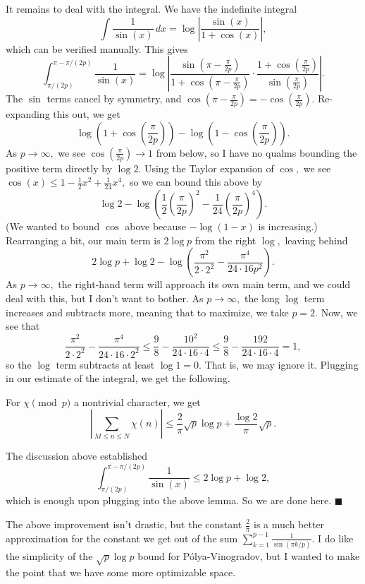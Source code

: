 It remains to deal with the integral. We have the indefinite integral
\[\int\frac1{\sin(x)}\,dx=\log\left|\frac{\sin(x)}{1+\cos(x)}\right|,\]
which can be verified manually. This gives
\[\int_{\pi/(2p)}^{\pi-\pi/(2p)}\frac1{\sin(x)}=\log\left|\frac{\sin\left(\pi-\frac\pi{2p}\right)}{1+\cos\left(\pi-\frac\pi{2p}\right)}\cdot\frac{1+\cos\left(\frac\pi{2p}\right)}{\sin\left(\frac\pi{2p}\right)}\right|.\]
The $\sin$ terms cancel by symmetry, and $\cos\left(\pi-\frac\pi{2p}\right)=-\cos\left(\frac\pi{2p}\right).$ Re-expanding this out, we get
\[\log\left(1+\cos\left(\frac\pi{2p}\right)\right)-\log\left(1-\cos\left(\frac\pi{2p}\right)\right).\]
As $p\to\infty,$ we see $\cos\left(\frac\pi{2p}\right)\to1$ from below, so I have no qualms bounding the positive term directly by $\log2.$ Using the Taylor expansion of $\cos,$ we see $\cos(x)\le1-\frac12x^2+\frac1{24}x^4,$ so we can bound this above by
\[\log2-\log\left(\frac12\left(\frac\pi{2p}\right)^2-\frac1{24}\left(\frac\pi{2p}\right)^4\right).\]
(We wanted to bound $\cos$ above because $-\log(1-x)$ is increasing.) Rearranging a bit, our main term is $2\log p$ from the right $\log,$ leaving behind
\[2\log p+\log2-\log\left(\frac{\pi^2}{2\cdot2^2}-\frac{\pi^4}{24\cdot16p^2}\right).\]
As $p\to\infty,$ the right-hand term will approach its own main term, and we could deal with this, but I don't want to bother. As $p\to\infty,$ the long $\log$ term increases and subtracts more, meaning that to maximize, we take $p=2.$ Now, we see that
\[\frac{\pi^2}{2\cdot2^2}-\frac{\pi^4}{24\cdot16\cdot2^2}\le\frac98-\frac{10^2}{24\cdot16\cdot4}\le\frac98-\frac{192}{24\cdot16\cdot4}=1,\]
so the $\log$ term subtracts at least $\log1=0.$ That is, we may ignore it. Plugging in our estimate of the integral, we get the following.
\begin{proposition}
    For $\chi\pmod p$ a nontrivial character, we get
    \[\left|\sum_{M\le n\le N}\chi(n)\right|\le\frac2\pi\sqrt p\log p+\frac{\log2}\pi\sqrt p.\]
\end{proposition}
The discussion above established
\[\int_{\pi/(2p)}^{\pi-\pi/(2p)}\frac1{\sin(x)}\le2\log p+\log2,\]
which is enough upon plugging into the above lemma. So we are done here. $\blacksquare$

The above improvement isn't drastic, but the constant $\frac2\pi$ is a much better approximation for the constant we get out of the sum $\sum_{k=1}^{p-1}\frac1{\sin(\pi k/p)}.$ I do like the simplicity of the $\sqrt p\log p$ bound for P\'olya-Vinogradov, but I wanted to make the point that we have some more optimizable space.

